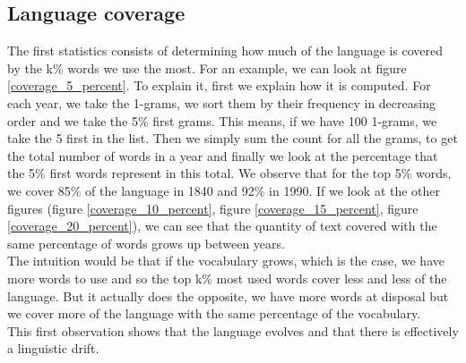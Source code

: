 \subsection{Language coverage}

The first statistics consists of determining how much of the language is covered by the k\% words we use the most. For an example, we can look at figure \ref{coverage_5_percent}. To explain it, first we explain how it is computed. For each year, we take the 1-grams, we sort them by their frequency in decreasing order and we take the 5\% first grams. This means, if we have 100 1-grams, we take the 5 first in the list. Then we simply sum the count for all the grams, to get the total number of words in a year and finally we look at the percentage that the 5\% first words represent in this total. We observe that for the top 5\% words, we cover 85\% of the language in 1840 and 92\% in 1990. If we look at the other figures (figure \ref{coverage_10_percent}, figure \ref{coverage_15_percent}, figure \ref{coverage_20_percent}), we can see that the quantity of text covered with the same percentage of words grows up between years.\\

The intuition would be that if the vocabulary grows, which is the case, we have more words to use and so the top k\% most used words cover less and less of the language. But it actually does the opposite, we have more words at disposal but we cover more of the language with the same percentage of the vocabulary. \\

This first observation shows that the language evolves and that there is effectively a linguistic drift.

